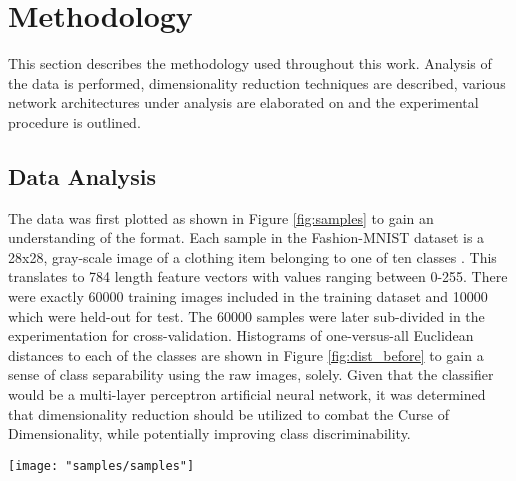 \documentclass[conference]{IEEEtran}
\begin{document}
\section{Methodology} \label{Methodology}
	This section describes the methodology used throughout this work.  Analysis of the data is performed, dimensionality reduction techniques are described, various network architectures under analysis are elaborated on and the experimental procedure is outlined.

	\subsection{Data Analysis}
	The data was first plotted as shown in Figure \ref{fig:samples} to gain an understanding of the format.  Each sample in the Fashion-MNIST dataset is a 28x28, gray-scale image of a clothing item belonging to one of ten classes \cite{Xiao2017FashionMNIST}. This translates to 784 length feature vectors with values ranging between 0-255. There were exactly 60000 training images included in the  training dataset and 10000 which were held-out for test.  The 60000 samples were later sub-divided in the experimentation for cross-validation. Histograms of one-versus-all Euclidean distances to each of the classes are shown in Figure \ref{fig:dist_before} to gain a sense of class separability using the raw images, solely.  Given that the classifier would be a multi-layer perceptron artificial neural network, it was determined that dimensionality reduction should be utilized to combat the Curse of Dimensionality, while potentially improving class discriminability.
	
	\begin{center}
		\begin{figure*}[h]
			\centering
			\texttt{[image: "samples/samples"]}
			\caption{Samples from the Fashion-MNIST dataset. One sample from each class was randomly chosen for visualization.  The gray-scale images are size 28x28, each representing an article of clothing.}
			\label{fig:samples}
		\end{figure*}
	\end{center}

	
\end{document}
